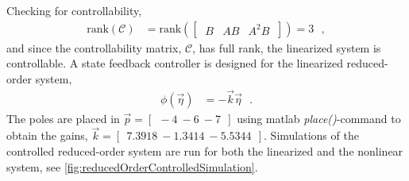 %
Checking for controllability,
\begin{align}
  \mathrm{rank}(\mathcal{C}) &= \mathrm{rank}([\ \begin{matrix} B & AB & A^2 B \end{matrix}\ ]) = 3  \ \ \ ,
\end{align}
and since the controllability matrix, $\mathcal{C}$, has full rank, the linearized system is controllable.
%
A state feedback controller is designed for the linearized reduced-order system,
\begin{align}
\phi(\vec{\eta}) &=   - \vec{k} \vec{\eta}  \ \ \ .
\end{align}
%
The poles are placed in $\vec{p} = [\ \ -4 \ -6 \ -7\ \ ]$ using matlab \textit{place()}-command to obtain the gains, $\vec{k} =  [\ \ 7.3918 \ -1.3414 \ -5.5344 \ \ ]$. Simulations of the controlled reduced-order system are run for both the linearized and the nonlinear system, see \autoref{fig:reducedOrderControlledSimulation}.
%
